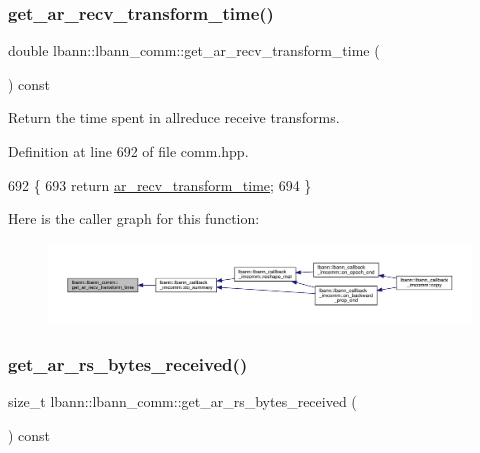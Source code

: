 \subsubsection{\texorpdfstring{get\+\_\+ar\+\_\+recv\+\_\+transform\+\_\+time()}{get\_ar\_recv\_transform\_time()}}
{\footnotesize\ttfamily double lbann\+::lbann\+\_\+comm\+::get\+\_\+ar\+\_\+recv\+\_\+transform\+\_\+time (\begin{DoxyParamCaption}{ }\end{DoxyParamCaption}) const\hspace{0.3cm}{\ttfamily [inline]}}

Return the time spent in allreduce receive transforms. 

Definition at line 692 of file comm.\+hpp.


\begin{DoxyCode}
692                                                    \{
693     \textcolor{keywordflow}{return} \hyperlink{classlbann_1_1lbann__comm_adb393f47d60eaa59bace80d2d3dd3bf2}{ar\_recv\_transform\_time};
694   \}
\end{DoxyCode}
Here is the caller graph for this function\+:\nopagebreak
\begin{figure}[H]
\begin{center}
\leavevmode
\includegraphics[width=350pt]{classlbann_1_1lbann__comm_afa5144a3d7bd40e1d78193d9f299e8ec_icgraph}
\end{center}
\end{figure}
\mbox{\label{classlbann_1_1lbann__comm_a4ed37b23401cd6df6502229bae0e5a1d}} 
\subsubsection{\texorpdfstring{get\+\_\+ar\+\_\+rs\+\_\+bytes\+\_\+received()}{get\_ar\_rs\_bytes\_received()}}
{\footnotesize\ttfamily size\+\_\+t lbann\+::lbann\+\_\+comm\+::get\+\_\+ar\+\_\+rs\+\_\+bytes\+\_\+received (\begin{DoxyParamCaption}{ }\end{DoxyParamCaption}) const\hspace{0.3cm}{\ttfamily [inline]}}


